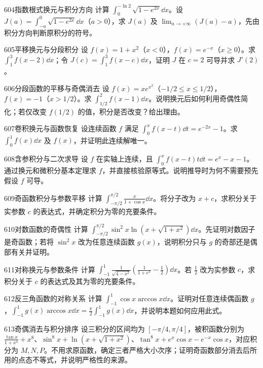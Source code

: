 \begin{exercise}{604}{指数根式换元与积分方向}
计算 $\int_0^{-\ln2}\sqrt{1-e^{2x}}\dd x$。设 $J(a)=\int_{-a}^0\sqrt{1-e^{2x}}\dd x$（$a>0$），求 $J(a)$ 及 $\lim_{a\to+\infty}(J(a)-a)$，先由积分方向判断原积分的符号。
\end{exercise}
\begin{exercise}{605}{平移换元与分段积分}
设 $f(x)=1+x^2$（$x<0$），$f(x)=e^{-x}$（$x\ge0$）。求 $\int_1^3f(x-2)\dd x$；令 $J(c)=\int_1^3f(x-c)\dd x$，证明 $J$ 在 $c=2$ 可导并求 $J'(2)$。
\end{exercise}
\begin{exercise}{606}{分段函数的平移与奇偶消去}
设 $f(x)=xe^{x^2}$（$-1/2\le x\le1/2$），$f(x)=-1$（$x>1/2$）。求 $\int_{1/2}^2f(x-1)\dd x$。说明换元后如何利用奇偶性简化；若仅改变 $f(1/2)$ 的值，积分是否改变？给出理由。
\end{exercise}
\begin{exercise}{607}{卷积换元与函数恢复}
设连续函数 $f$ 满足 $\int_0^xf(x-t)\dd t=e^{-2x}-1$。求 $\int_0^1f(x)\dd x$ 及 $f(x)$，并证明此连续解唯一。
\end{exercise}
\begin{exercise}{608}{含参积分与二次求导}
设 $f$ 在实轴上连续，且 $\int_0^xf(x-t)t\dd t=e^x-x-1$。通过换元和微积分基本定理求 $f$，并直接核验原等式。说明推导时为何不需要预先假设 $f$ 可导。
\end{exercise}
\begin{exercise}{609}{奇函数积分与参数平移}
计算 $\int_{-\pi/2}^{\pi/2}\frac{x}{1+\cos x}\dd x$。将分子改为 $x+c$，求积分关于实参数 $c$ 的表达式，并确定积分为零的充要条件。
\end{exercise}
\begin{exercise}{610}{对数函数的奇偶性}
计算 $\int_{-\pi/2}^{\pi/2}\sin^2x\ln(x+\sqrt{1+x^2})\dd x$。先证明对数因子是奇函数；若将 $\sin^2x$ 改为任意连续函数 $g(x)$，说明积分只与 $g$ 的奇部还是偶部有关并证明。
\end{exercise}
\begin{exercise}{611}{对称换元与参数条件}
计算 $\int_{-1}^1\frac1{\sqrt{4-x^2}}\left(\frac1{1+e^x}-\frac12\right)\dd x$。若 $\frac12$ 改为实参数 $c$，求积分关于 $c$ 的表达式及其为零的充要条件。
\end{exercise}
\begin{exercise}{612}{反三角函数的对称关系}
计算 $\int_{-1}^1\cos x\arccos x\dd x$。证明对任意连续偶函数 $g$，$\int_{-1}^1g(x)\arccos x\dd x=\frac\pi2\int_{-1}^1g(x)\dd x$，并说明本题如何应用此式。
\end{exercise}
\begin{exercise}{613}{奇偶消去与积分排序}
设三积分的区间均为 $[-\pi/4,\pi/4]$，被积函数分别为 $\frac{\tan x}{1+x^4}+x^8$、$\sin^8x+\ln(x+\sqrt{1+x^2})$、$\tan^8x+e^x\cos x-e^{-x}\cos x$，对应积分为 $M,N,P$。不用求原函数，确定三者严格大小次序；证明奇函数部分消去后所用的点态不等式，并说明严格性的来源。
\end{exercise}
